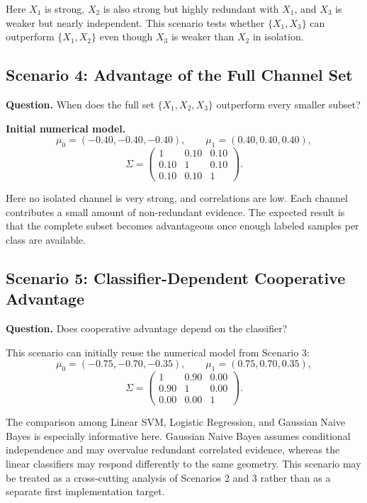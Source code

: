 \documentclass[11pt,a4paper]{article}
\begin{document}
Here $X_1$ is strong, $X_2$ is also strong but highly redundant with $X_1$, and $X_3$ is weaker but nearly independent. This scenario tests whether $\{X_1,X_3\}$ can outperform $\{X_1,X_2\}$ even though $X_3$ is weaker than $X_2$ in isolation.

\subsection{Scenario 4: Advantage of the Full Channel Set}

\textbf{Question.} When does the full set $\{X_1,X_2,X_3\}$ outperform every smaller subset?

\textbf{Initial numerical model.}
\[
    \mu_0=(-0.40,-0.40,-0.40),
    \qquad
    \mu_1=(0.40,0.40,0.40),
\]
\[
\Sigma=
\begin{pmatrix}
1 & 0.10 & 0.10\\
0.10 & 1 & 0.10\\
0.10 & 0.10 & 1
\end{pmatrix}.
\]

Here no isolated channel is very strong, and correlations are low. Each channel contributes a small amount of non-redundant evidence. The expected result is that the complete subset becomes advantageous once enough labeled samples per class are available.

\subsection{Scenario 5: Classifier-Dependent Cooperative Advantage}

\textbf{Question.} Does cooperative advantage depend on the classifier?

This scenario can initially reuse the numerical model from Scenario 3:
\[
    \mu_0=(-0.75,-0.70,-0.35),
    \qquad
    \mu_1=(0.75,0.70,0.35),
\]
\[
\Sigma=
\begin{pmatrix}
1 & 0.90 & 0.00\\
0.90 & 1 & 0.00\\
0.00 & 0.00 & 1
\end{pmatrix}.
\]

The comparison among Linear SVM, Logistic Regression, and Gaussian Naive Bayes is especially informative here. Gaussian Naive Bayes assumes conditional independence and may overvalue redundant correlated evidence, whereas the linear classifiers may respond differently to the same geometry. This scenario may be treated as a cross-cutting analysis of Scenarios 2 and 3 rather than as a separate first implementation target.
\end{document}
